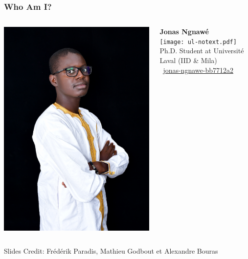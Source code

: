 \documentclass[english,usenames,dvipsnames]{beamer}
\begin{document}
\begin{frame}
	\frametitle{Who Am I?}
	\begin{center}
		\begin{columns}
			\begin{column}{0.4\textwidth}
				\centering
				\includegraphics[width=\textwidth]{figures/Jonas.JPG}
			\end{column}
			\begin{column}{0.6\textwidth}
				\textbf{Jonas Ngnawé}\\
				\vspace{1em}
                \texttt{[image: ul-notext.pdf]} Ph.D. Student at Université Laval (IID \& Mila) \\
				\vspace{0.5em}
				\vspace{1em}
				{\color{NavyBlue} \faLinkedin}~\href{https://www.linkedin.com/in/jonas-ngnawe-bb7712a2/}{jonas-ngnawe-bb7712a2}
			\end{column}
		\end{columns}
	\end{center}
 Slides Credit: Frédérik Paradis, Mathieu Godbout et Alexandre Bouras
\end{frame}
\end{document}
